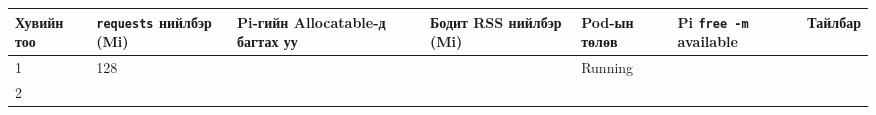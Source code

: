 \begingroup\scriptsize\begin{longtable}[]{@{}lllllll@{}}
\toprule
\begin{minipage}[b]{0.12\columnwidth}\raggedright
Хувийн тоо\strut
\end{minipage} & \begin{minipage}[b]{0.12\columnwidth}\raggedright
\texttt{requests} нийлбэр (Mi)\strut
\end{minipage} & \begin{minipage}[b]{0.12\columnwidth}\raggedright
Pi-гийн Allocatable-д багтах уу\strut
\end{minipage} & \begin{minipage}[b]{0.12\columnwidth}\raggedright
Бодит RSS нийлбэр (Mi)\strut
\end{minipage} & \begin{minipage}[b]{0.12\columnwidth}\raggedright
Pod-ын төлөв\strut
\end{minipage} & \begin{minipage}[b]{0.12\columnwidth}\raggedright
Pi \texttt{free\ -m} available\strut
\end{minipage} & \begin{minipage}[b]{0.12\columnwidth}\raggedright
Тайлбар\strut
\end{minipage}\tabularnewline
\midrule
\endhead
\begin{minipage}[t]{0.12\columnwidth}\raggedright
1\strut
\end{minipage} & \begin{minipage}[t]{0.12\columnwidth}\raggedright
128\strut
\end{minipage} & \begin{minipage}[t]{0.12\columnwidth}\raggedright
\strut
\end{minipage} & \begin{minipage}[t]{0.12\columnwidth}\raggedright
\strut
\end{minipage} & \begin{minipage}[t]{0.12\columnwidth}\raggedright
Running\strut
\end{minipage} & \begin{minipage}[t]{0.12\columnwidth}\raggedright
\strut
\end{minipage} & \begin{minipage}[t]{0.12\columnwidth}\raggedright
\strut
\end{minipage}\tabularnewline
\begin{minipage}[t]{0.12\columnwidth}\raggedright
2\strut
\end{minipage} & \begin{minipage}[t]{0.12\columnwidth}\raggedright

\end{minipage}
\end{longtable}
